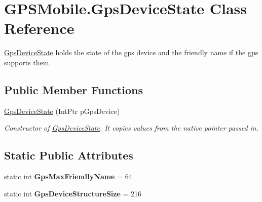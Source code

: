 \hypertarget{class_g_p_s_mobile_1_1_gps_device_state}{
\section{GPSMobile.GpsDeviceState Class Reference}
\label{class_g_p_s_mobile_1_1_gps_device_state}
}


\hyperlink{class_g_p_s_mobile_1_1_gps_device_state}{GpsDeviceState} holds the state of the gps device and the friendly name if the gps supports them.  
\subsection*{Public Member Functions}
\begin{DoxyCompactItemize}
\item 
\hyperlink{class_g_p_s_mobile_1_1_gps_device_state_a83d5d8cc7c5e9370d5a3ebf2a940f7bf}{GpsDeviceState} (IntPtr pGpsDevice)
\begin{DoxyCompactList}\small\item\em Constructor of \hyperlink{class_g_p_s_mobile_1_1_gps_device_state}{GpsDeviceState}. It copies values from the native pointer passed in. \item\end{DoxyCompactList}\end{DoxyCompactItemize}
\subsection*{Static Public Attributes}
\begin{DoxyCompactItemize}
\item 
\hypertarget{class_g_p_s_mobile_1_1_gps_device_state_ae10b69b262399d1ebf476a8ebee50068}{
static int {\bfseries GpsMaxFriendlyName} = 64}
\label{class_g_p_s_mobile_1_1_gps_device_state_ae10b69b262399d1ebf476a8ebee50068}

\item 
\hypertarget{class_g_p_s_mobile_1_1_gps_device_state_abea27e3c34b8bcd4be600c6c542f3736}{
static int {\bfseries GpsDeviceStructureSize} = 216}
\label{class_g_p_s_mobile_1_1_gps_device_state_abea27e3c34b8bcd4be600c6c542f3736}

\end{DoxyCompactItemize}
